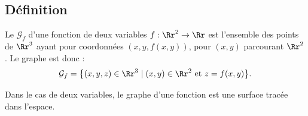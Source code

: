 \documentclass[11pt,class=report,crop=false]{standalone}
\begin{document}



\subsection{Définition}





\begin{definition}
Le  $\mathcal{G}_f$ d'une fonction de deux variables $f : \Rr^2 \to \Rr$ est  l'ensemble des points de $\Rr^3$ ayant pour coordonnées $(x,y,f(x,y))$, pour $(x,y)$ parcourant $\Rr^2$. Le graphe est donc :
$$\mathcal{G}_f= \big\{ (x,y,z) \in \Rr^3 \mid (x,y)\in \Rr^2 \text{ et } z=f(x,y)\big\}.$$
\end{definition}

Dans le cas de deux variables, le graphe d'une fonction est une surface tracée dans l'espace.


   
\end{document}
